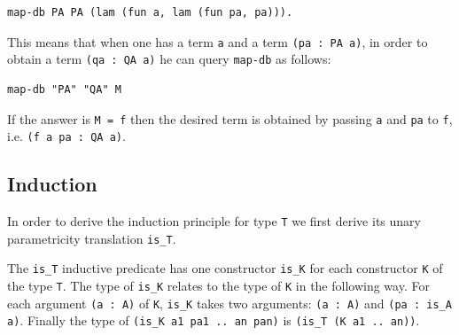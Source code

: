 \documentclass[sigplan,10pt,review]{acmart}\settopmatter{printfolios=true,printccs=false,printacmref=false}
\begin{document}
\begin{minipage}{\textwidth}\begin{lstlisting}[]
map-db PA PA (lam (fun a, lam (fun pa, pa))).
\end{lstlisting}\end{minipage}

\noindent
This means that when one has a term \lstinline+a+
and a term \lstinline+(pa : PA a)+, in order to
obtain a term \lstinline+(qa : QA a)+ he can
query \lstinline+map-db+ as follows:

\begin{minipage}{\textwidth}\begin{lstlisting}[]
map-db "PA" "QA" M
\end{lstlisting}\end{minipage}

\noindent
If the answer is \lstinline+M = f+ then
the desired term is
obtained by passing
\lstinline+a+ and \lstinline+pa+ to \lstinline+f+, i.e.
\lstinline+(f a pa : QA a)+.

\subsection{Induction} %
\label{sec:induction}

In order to derive the induction principle for type
\lstinline+T+ we first derive its unary parametricity
translation \lstinline+is_T+. 

The \lstinline+is_T+ inductive
predicate has one constructor \lstinline+is_K+ for each
constructor \lstinline+K+ of the type \lstinline+T+.
The type of \lstinline+is_K+ relates to the type of
\lstinline+K+ in the following way. For each
argument \lstinline+(a : A)+
of \lstinline+K+, \lstinline+is_K+ takes two arguments:
\lstinline+(a : A)+ and \lstinline+(pa : is_A a)+.
Finally the type of \lstinline+(is_K a1 pa1 .. an pan)+ is
\lstinline+(is_T (K a1 .. an))+.
\end{document}
